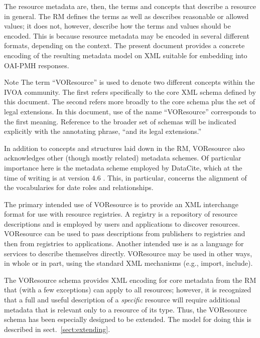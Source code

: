 \documentclass[11pt,a4paper]{ivoa}
\begin{document}
The resource metadata are, then, the terms and concepts that describe
a resource in general.  The RM defines the terms as well as describes
reasonable or allowed values; it does not, however, describe how the
terms and values should be encoded.  This is because resource metadata
may be encoded in several different formats, depending on the context.
The present document provides a concrete encoding of the resulting
metadata model on XML suitable for embedding into OAI-PMH responses.

\begin{admonition}{Note}
The term ``VOResource'' is used to denote two different concepts within
the IVOA community.
The first refers specifically to the core
XML schema defined by this document.  The second refers more
broadly to the core schema plus the set of legal extensions.
In this document, use of the name ``VOResource'' corresponds to
the first meaning.  Reference to the broader set of schemas
will be indicated explicitly with the annotating phrase, ``and
its legal extensions.''
\end{admonition}

In addition to concepts and structures laid down in the RM, VOResource
also acknowledges other (though mostly related) metadata schemes.  Of
particular importance here is the metadata scheme employed by DataCite,
which at the time of writing is at version 4.6 \citep{std:DataCite46}.
This, in particular, concerns the alignment of the vocabularies for date
roles and relationships.

The primary intended use of VOResource is to provide an XML interchange
format for use with resource registries.  A registry is a repository of
resource descriptions and is employed by users and applications to
discover resources.  VOResource can be used to pass descriptions from
publishers to registries and then from registries to applications.
Another intended use is as a language for services to describe themselves
directly.  VOResource may be used in other ways, in whole or in part,
using the standard XML mechanisms (e.g., import, include).

The VOResource schema provides XML encoding for core
metadata from the RM that (with a few exceptions)
can apply to all resources; however, it is recognized that a full and
useful description of a \emph{specific} resource will require
additional metadata that is relevant only to a resource of its type.
Thus, the VOResource schema has been especially designed to be
extended.  The model for doing this is described in
sect.~\ref{sect:extending}.
\end{document}
